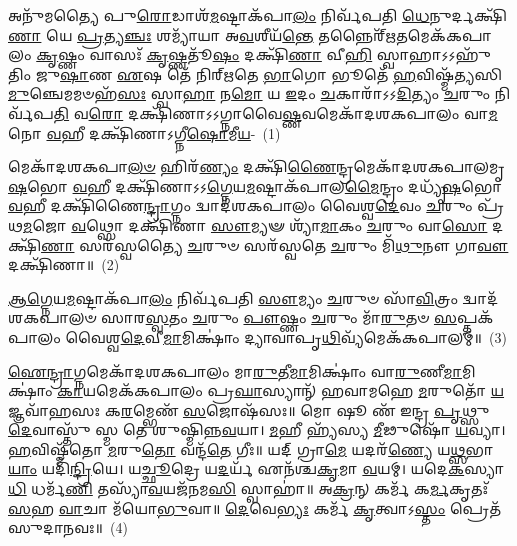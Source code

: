 \setcounter{anuvakam}{0}
𑌅𑌨𑍁᳴𑌮𑌤𑍍𑌯𑍈 𑌪𑍁\-\ul{𑌰𑍋}\-𑌡𑌾𑌶᳴\-\-\ul{𑌮}\-𑌷𑍍𑌟𑌾\-𑌕᳴𑌪𑌾\-\ul{𑌲𑌂} 𑌨𑌿𑌰𑍍𑌵᳴𑌪𑌤𑌿 \ul{𑌧𑍇}\-𑌨𑍁𑌰𑍍𑌦𑌕𑍍𑌷𑌿᳴\-\ul{𑌣𑌾} 𑌯𑍇 \ul{𑌪𑍍𑌰}\-𑌤𑍍𑌯\-\ul{𑌞𑍍𑌚𑌃} 𑌶𑌮𑍍𑌯𑌾᳴𑌯𑌾 𑌅\-\ul{𑌵}\-𑌶𑍀𑌯᳴\-\ul{𑌨𑍍𑌤𑍇} 𑌤𑌨𑍍𑌨𑍈𑌰𑍍᳴\-\ul{𑌋}\-𑌤𑌮𑍇𑌕᳴𑌕𑌪𑌾𑌲𑌂 \ul{𑌕𑍃}\-𑌷𑍍𑌣𑌂 𑌵𑌾𑌸𑌃᳴ \ul{𑌕𑍃}\-𑌷𑍍𑌣𑌤𑍂᳴\-\ul{𑌷𑌂} 𑌦𑌕𑍍𑌷𑌿᳴\-\ul{𑌣𑌾} 𑌵𑍀\-\ul{𑌹𑌿} 𑌸𑍍𑌵𑌾𑌹𑌾\-𑌽\-𑌽𑌹𑍁᳴𑌤𑌿𑌂 𑌜𑍁\-\ul{𑌷𑌾}\-𑌣 \ul{𑌏}\-𑌷 𑌤𑍇᳴ 𑌨𑌿𑌰𑍍\mbox{}𑌋𑌤𑍇 \ul{𑌭𑌾}\-𑌗𑍋 𑌭𑍂𑌤𑍇᳴ \ul{𑌹}\-𑌵𑌿𑌷𑍍𑌮᳴𑌤𑍍𑌯𑌸𑌿 \ul{𑌮𑍁}\-𑌞𑍍𑌚𑍇𑌮𑌮𑍞𑌹᳴\-\ul{𑌸𑌃} 𑌸𑍍𑌵𑌾\-\ul{𑌹𑌾} 𑌨\-\ul{𑌮𑍋} 𑌯 \ul{𑌇}\-𑌦𑌂 \ul{𑌚}\-𑌕𑌾𑌰𑌾᳴\-𑌽\-𑌽\-\ul{𑌦𑌿}\-𑌤𑍍𑌯𑌂 \ul{𑌚}\-𑌰𑍁𑌂 𑌨𑌿𑌰𑍍𑌵᳴𑌪\-\ul{𑌤𑌿} 𑌵\-\ul{𑌰𑍋} 𑌦𑌕𑍍𑌷𑌿᳴𑌣𑌾\-𑌽\-𑌽𑌗𑍍𑌨𑌾𑌵𑍈\-\ul{𑌷𑍍𑌣}\-𑌵𑌮𑍇𑌕𑌾᳴\-𑌦𑌶\-𑌕𑌪𑌾𑌲𑌂 𑌵𑌾\-\ul{𑌮}\-𑌨𑍋 \ul{𑌵}\-𑌹𑍀 𑌦𑌕𑍍𑌷𑌿᳴𑌣𑌾\-𑌽𑌗𑍍𑌨𑍀\-\ul{𑌷𑍋}\-𑌮𑍀\-\ul{𑌯}\--~(1)

𑌮𑍇𑌕𑌾᳴\-𑌦𑌶\-𑌕𑌪𑌾\-\ul{𑌲}\-\-\ul{𑍞} 𑌹𑌿𑌰᳴\-\ul{𑌣𑍍𑌯𑌂} 𑌦𑌕𑍍𑌷𑌿᳴\-\ul{𑌣𑍈}\-𑌨𑍍𑌦𑍍𑌰𑌮𑍇𑌕𑌾᳴\-𑌦𑌶\-𑌕𑌪𑌾𑌲𑌮𑍃\-\ul{𑌷}\-𑌭𑍋 \ul{𑌵}\-𑌹𑍀 𑌦𑌕𑍍𑌷𑌿᳴𑌣𑌾\-𑌽\-𑌽\-\ul{𑌗𑍍𑌨𑍇}\-𑌯\-\ul{𑌮}\-𑌷𑍍𑌟𑌾𑌕᳴𑌪𑌾𑌲\-\ul{𑌮𑍈}\-𑌨𑍍𑌦𑍍𑌰𑌂 𑌦𑌧𑍍𑌯𑍃᳴\-\ul{𑌷}\-𑌭𑍋 \ul{𑌵}\-𑌹𑍀 𑌦𑌕𑍍𑌷𑌿᳴𑌣𑍈\-\ul{𑌨𑍍𑌦𑍍𑌰𑌾}\-𑌗𑍍𑌨𑌂 𑌦𑍍𑌵𑌾𑌦᳴𑌶\-𑌕𑌪𑌾𑌲𑌂 𑌵𑍈𑌶𑍍𑌵\-\ul{𑌦𑍇}\-𑌵𑌂 \ul{𑌚}\-𑌰𑍁𑌂 𑌪𑍍𑌰᳴𑌥\-\ul{𑌮}\-𑌜𑍋 \ul{𑌵}\-𑌥𑍍𑌸𑍋 𑌦𑌕𑍍𑌷𑌿᳴𑌣𑌾 \ul{𑌸𑍗}\-𑌮𑍍𑌯𑍟 𑌶𑍍𑌯𑌾᳴\-\ul{𑌮𑌾}\-𑌕𑌂 \ul{𑌚}\-𑌰𑍁𑌂 𑌵𑌾\-\ul{𑌸𑍋} 𑌦𑌕𑍍𑌷𑌿᳴\-\ul{𑌣𑌾} 𑌸𑌰᳴𑌸𑍍𑌵𑌤𑍍𑌯𑍈 \ul{𑌚}\-𑌰𑍁𑍞 𑌸𑌰᳴𑌸𑍍𑌵𑌤𑍇 \ul{𑌚}\-𑌰𑍁𑌂 𑌮𑌿᳴\-\ul{𑌥𑍁}\-𑌨𑍗 𑌗𑌾\-\ul{𑌵𑍗} 𑌦𑌕𑍍𑌷𑌿᳴𑌣𑌾॥~(2)

{\anuvakamend[{\-\ul{𑌅}\-\-\ul{𑌗𑍍𑌨𑍀}\-\-\ul{𑌷𑍋}\-𑌮𑍀\-\ul{𑌯𑌂} 𑌚𑌤𑍁᳴𑌸𑍍𑌤𑍍𑌰𑌿𑍞𑌶𑌚𑍍𑌚}]}%

\-\ul{𑌆}\-\-\ul{𑌗𑍍𑌨𑍇}\-𑌯\-\ul{𑌮}\-𑌷𑍍𑌟𑌾\-𑌕᳴𑌪𑌾\-\ul{𑌲𑌂} 𑌨𑌿𑌰𑍍𑌵᳴𑌪𑌤𑌿 \ul{𑌸𑍗}\-𑌮𑍍𑌯𑌂 \ul{𑌚}\-𑌰𑍁𑍞 𑌸𑌾᳴\-\ul{𑌵𑌿}\-𑌤𑍍𑌰𑌂 𑌦𑍍𑌵𑌾𑌦᳴𑌶\-𑌕𑌪𑌾𑌲𑍞 𑌸𑌾𑌰\-\ul{𑌸𑍍𑌵}\-𑌤𑌂 \ul{𑌚}\-𑌰𑍁𑌂 \ul{𑌪𑍗}\-𑌷𑍍𑌣𑌂 \ul{𑌚}\-𑌰𑍁𑌂 𑌮𑌾᳴\-\ul{𑌰𑍁}\-𑌤𑍞 \ul{𑌸}\-𑌪𑍍𑌤𑌕᳴𑌪𑌾𑌲𑌂 𑌵𑍈𑌶𑍍𑌵\-\ul{𑌦𑍇}\-𑌵𑍀\-\ul{𑌮𑌾}\-𑌮𑌿𑌕𑍍𑌷𑌾𑌂॑ 𑌦𑍍𑌯𑌾𑌵𑌾𑌪𑍃\-\ul{𑌥𑌿}\-𑌵𑍍𑌯᳴𑌮𑍇𑌕᳴𑌕𑌪𑌾𑌲𑌮𑍍॥~(3)

{\anuvakamend[{\-\ul{𑌆}\-\-\ul{𑌗𑍍𑌨𑍇}\-𑌯\-\ul{𑌮}\-𑌷𑍍𑌟𑌾𑌦᳴𑌶}]}%

\-\ul{𑌐}\-\-\ul{𑌨𑍍𑌦𑍍𑌰𑌾}\-𑌗𑍍𑌨𑌮𑍇𑌕𑌾᳴\-𑌦𑌶\-𑌕𑌪𑌾𑌲𑌂 𑌮𑌾\-\ul{𑌰𑍁}\-𑌤𑍀\-\ul{𑌮𑌾}\-𑌮𑌿𑌕𑍍𑌷𑌾𑌂॑ 𑌵𑌾\-\ul{𑌰𑍁}\-𑌣𑍀\-\ul{𑌮𑌾}\-𑌮𑌿𑌕𑍍𑌷𑌾𑌂॑ \ul{𑌕𑌾}\-𑌯𑌮𑍇𑌕᳴𑌕𑌪𑌾𑌲𑌂 𑌪𑍍𑌰\-\ul{𑌘𑌾}\-𑌸𑍍𑌯𑌾𑌨𑍍᳴ 𑌹𑌵𑌾𑌮𑌹𑍇 \ul{𑌮}\-𑌰𑍁𑌤𑍋᳴ \ul{𑌯}\-𑌜𑍍𑌞𑌵𑌾᳴𑌹𑌸𑌃 𑌕\-\ul{𑌰}\-𑌮𑍍𑌭𑍇𑌣᳴ \ul{𑌸}\-𑌜𑍋𑌷᳴𑌸𑌃॥ 𑌮𑍋 𑌷𑍂 𑌣᳴ 𑌇𑌨𑍍𑌦𑍍𑌰 \ul{𑌪𑍃}\-𑌥𑍍𑌸𑍁 \ul{𑌦𑍇}\-𑌵𑌾𑌸𑍍𑌤𑍁᳴ 𑌸𑍍𑌮 𑌤𑍇 𑌶𑍁𑌷𑍍𑌮𑌿𑌨𑍍𑌨\-\ul{𑌵}\-𑌯𑌾। \ul{𑌮}\-𑌹𑍀 𑌹𑍍𑌯᳴𑌸𑍍𑌯 \ul{𑌮𑍀}\-𑌢𑍁𑌷𑍋᳴ \ul{𑌯}\-𑌵𑍍𑌯𑌾। \ul{𑌹}\-𑌵𑌿𑌷𑍍𑌮᳴𑌤𑍋 \ul{𑌮}\-𑌰𑍁\-\ul{𑌤𑍋} 𑌵𑌨𑍍𑌦᳴\-\ul{𑌤𑍇} 𑌗𑍀𑌃॥ 𑌯𑌦𑍍 𑌗𑍍𑌰𑌾\-\ul{𑌮𑍇} 𑌯𑌦𑌰᳴\-\ul{𑌣𑍍𑌯𑍇} 𑌯\-\ul{𑌥𑍍𑌸}\-𑌭𑌾\-\ul{𑌯𑌾𑌂} 𑌯𑌦𑌿᳴\-\ul{𑌨𑍍𑌦𑍍𑌰𑌿}\-𑌯𑍇। 𑌯\-\ul{𑌚𑍍𑌛𑍂}\-𑌦𑍍𑌰𑍇 𑌯\-\ul{𑌦}\-𑌰𑍍𑌯᳴ 𑌏𑌨᳴𑌶𑍍𑌚\-\ul{𑌕𑍃}\-𑌮𑌾 \ul{𑌵}\-𑌯𑌮𑍍। 𑌯𑌦𑍇\-\ul{𑌕}\-𑌸𑍍𑌯𑌾\-\ul{𑌧𑌿} 𑌧𑌰𑍍𑌮᳴\-\ul{𑌣𑌿} 𑌤𑌸𑍍𑌯𑌾᳴\-\ul{𑌵}\-𑌯𑌜᳴𑌨𑌮\-\ul{𑌸𑌿} 𑌸𑍍𑌵𑌾𑌹𑌾॑॥ 𑌅\-\ul{𑌕𑍍𑌰}\-𑌨𑍍 𑌕𑌰𑍍𑌮᳴ 𑌕\-\ul{𑌰𑍍𑌮}\-𑌕𑍃𑌤𑌃᳴ \ul{𑌸}\-𑌹 \ul{𑌵𑌾}\-𑌚𑌾 𑌮᳴𑌯𑍋\-\ul{𑌭𑍁}\-𑌵𑌾॥ \ul{𑌦𑍇}\-𑌵𑍇\-\ul{𑌭𑍍𑌯𑌃} 𑌕𑌰𑍍𑌮᳴ \ul{𑌕𑍃}\-𑌤𑍍𑌵𑌾\-𑌽\-\ul{𑌸𑍍𑌤𑌂} 𑌪𑍍𑌰𑍇𑌤᳴ 𑌸𑍁𑌦𑌾𑌨𑌵𑌃॥~(4)

